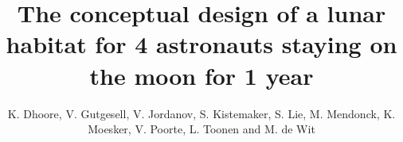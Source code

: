 \documentclass{tudelft-report}
\begin{document}
\frontmatter

\title[DSE Spring 2017: Midterm Report (draft)]{The conceptual design of a lunar habitat for 4 astronauts staying on the moon for 1 year}
\author{K. Dhoore{,} V. Gutgesell{,}  V. Jordanov{,} S. Kistemaker{,} S. Lie{,} M. Mendonck{,} K. Moesker{,} V. Poorte{,} L. Toonen and M. de Wit}



\tableofcontents

\mainmatter


\end{document}
